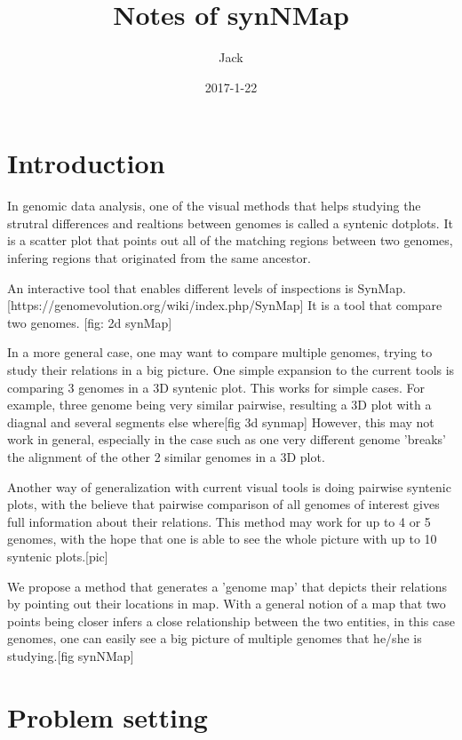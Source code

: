 \documentclass[12pt]{article}
\title{Notes of synNMap}
\date{2017-1-22}
\author{Jack}
\begin{document}
\maketitle

\newpage
{}
\tableofcontents

\newpage
{}

\section{Introduction}
In genomic data analysis, one of the visual methods that helps studying the strutral differences and realtions between genomes is called a syntenic dotplots. It is a scatter plot that points out all of the matching regions between two genomes, infering regions that originated from the same ancestor.

An interactive tool that enables different levels of inspections is SynMap. [https://genomevolution.org/wiki/index.php/SynMap] It is a tool that compare two genomes. [fig: 2d synMap]

In a more general case, one may want to compare multiple genomes, trying to study their relations in a big picture. One simple expansion to the current tools is comparing 3 genomes in a 3D syntenic plot. This works for simple cases. For example, three genome being very similar pairwise, resulting a 3D plot with a diagnal and several segments else where[fig 3d synmap] However, this may not work in general, especially in the case such as one very different genome 'breaks' the alignment of the other 2 similar genomes in a 3D plot.

Another way of generalization with current visual tools is doing pairwise syntenic plots, with the believe that pairwise comparison of all genomes of interest gives full information about their relations. This method may work for up to 4 or 5 genomes, with the hope that one is able to see the whole picture with up to 10 syntenic plots.[pic]

We propose a method that generates a 'genome map' that depicts their relations by pointing out their locations in map. With a general notion of a map that two points being closer infers a close relationship between the two entities, in this case genomes, one can easily see a big picture of multiple genomes that he/she is studying.[fig synNMap]

\section{Problem setting}
\end{document}
